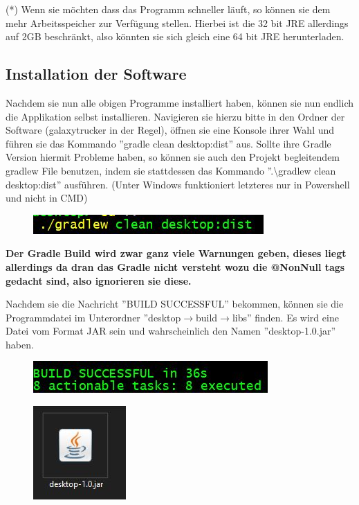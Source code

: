 \documentclass[fontsize=12pt,paper=a4,twoside]{scrartcl}
\begin{document}
(*) Wenn sie möchten dass das Programm schneller läuft, so können sie dem mehr Arbeitsspeicher zur Verfügung stellen. Hierbei ist die 32 bit JRE allerdings auf 2GB beschränkt, also könnten sie sich gleich eine 64 bit JRE herunterladen.


\subsection{Installation der Software}

Nachdem sie nun alle obigen Programme installiert haben, können sie nun endlich die Applikation selbst installieren. Navigieren sie hierzu bitte in den Ordner der Software (galaxytrucker in der Regel), öffnen sie eine Konsole ihrer Wahl und führen sie das Kommando ''gradle clean desktop:dist'' aus. Sollte ihre Gradle Version hiermit Probleme haben, so können sie auch den Projekt begleitendem gradlew File benutzen, indem sie stattdessen das Kommando ''.\textbackslash gradlew clean desktop:dist'' ausführen. (Unter Windows funktioniert letzteres nur in Powershell und nicht in CMD)  
\begin{figure}[h!]
\centering
\includegraphics[width=0.5\linewidth]{command.JPG}
\end{figure} 
\textbf{Der Gradle Build wird zwar ganz viele Warnungen geben, dieses liegt allerdings da dran das Gradle nicht versteht wozu die @NonNull tags gedacht sind, also ignorieren sie diese.}

Nachdem sie die Nachricht ''BUILD SUCCESSFUL'' bekommen, können sie die Programmdatei im Unterordner ''desktop$\rightarrow$build$\rightarrow$libs'' finden. Es wird eine Datei vom Format JAR sein und wahrscheinlich den Namen ''desktop-1.0.jar'' haben.

\begin{figure}[h!]
\centering
\includegraphics[width=0.5\linewidth]{gradle_build.JPG}
\end{figure} 

\begin{figure}[h!]
\centering
\includegraphics[width=0.5\linewidth]{application.JPG}
\end{figure} 
\end{document}
